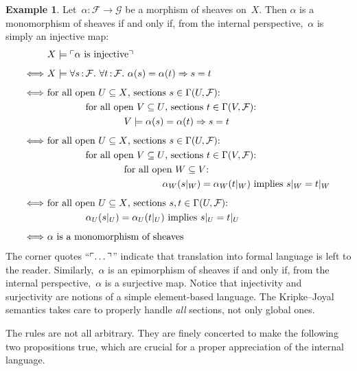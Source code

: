 \documentclass[10pt,reqno,a4paper]{amsbook}
\theoremstyle{definition}
\newtheorem{ex}[defn]{Example}
\theoremstyle{plain}
\theoremstyle{remark}
\newcommand{\F}{\mathcal{F}}
\renewcommand{\G}{\mathcal{G}}
\newcommand{\?}{\,{:}\,}
\renewcommand{\_}{\mathpunct{.}\,}
\newcommand{\speak}[1]{\ulcorner\text{\textnormal{#1}}\urcorner}
\begin{document}
\begin{ex}\label{ex:injective-surjective}
Let~$\alpha : \F \to \G$ be a morphism of sheaves on~$X$. Then
$\alpha$ is a monomorphism of sheaves if and only if, from the internal
perspective,~$\alpha$ is simply an injective map:
\allowdisplaybreaks
\begin{align*}
  & X \models \speak{$\alpha$ is injective} \\[0.5em]
  \Longleftrightarrow\
  & X \models \forall s\?\F\_ \forall t\?\F\_ \alpha(s) = \alpha(t) \Rightarrow s = t \\[0.5em]
  \Longleftrightarrow\ &
    \text{for all open~$U \subseteq X$, sections $s \in \Gamma(U, \F)$:} \\
  &\qquad\qquad \text{for all open~$V \subseteq U$, sections $t \in \Gamma(V, \F)$:} \\
  &\qquad\qquad\qquad\qquad
      V \models \alpha(s) = \alpha(t) \Rightarrow s = t \\[0.5em]
  \Longleftrightarrow\ &
    \text{for all open~$U \subseteq X$, sections $s \in \Gamma(U, \F)$:} \\
  &\qquad\qquad \text{for all open~$V \subseteq U$, sections $t \in \Gamma(V, \F)$:} \\
  &\qquad\qquad\qquad\qquad
      \text{for all open~$W \subseteq V$:} \\
  &\qquad\qquad\qquad\qquad\qquad\qquad
        \text{$\alpha_W(s|_W) = \alpha_W(t|_W)$ implies $s|_W = t|_W$} \\[0.5em]
  \Longleftrightarrow\ &
    \text{for all open~$U \subseteq X$, sections $s, t \in \Gamma(U, \F)$:} \\
  &\qquad\qquad
        \text{$\alpha_U(s|_U) = \alpha_U(t|_U)$ implies $s|_U = t|_U$} \\[0.5em]
  \Longleftrightarrow\ &
    \text{$\alpha$ is a monomorphism of sheaves}
\end{align*}
The corner quotes ``$\speak{\ldots}$'' indicate that translation into formal
language is left to the reader. Similarly,~$\alpha$ is an epimorphism of
sheaves if and only if, from the internal perspective,~$\alpha$ is a
surjective map. Notice that injectivity and surjectivity are
notions of a simple element-based language. The Kripke--Joyal semantics
takes care to properly handle \emph{all} sections, not only global ones.
\end{ex}

The rules are not all arbitrary. They are finely concerted to make the
following two propositions true, which are crucial for a proper appreciation of the
internal language.
\end{document}
